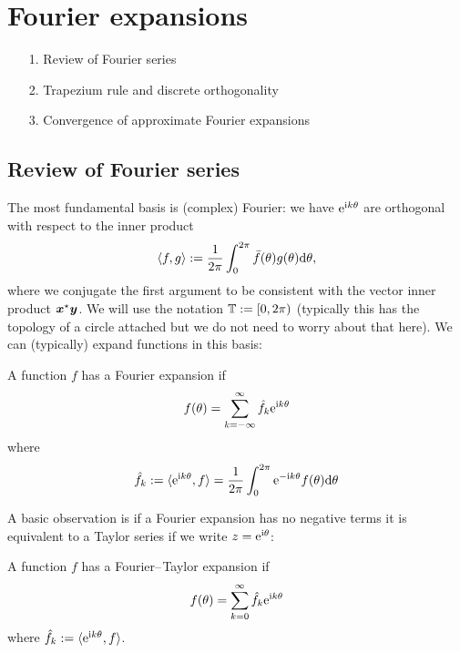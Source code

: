 
\section{Fourier expansions}
\begin{itemize}
\item[1. ] Review of Fourier series


\item[2. ] Trapezium rule and discrete orthogonality


\item[3. ] Convergence of approximate Fourier expansions

\end{itemize}
\subsection{Review of Fourier series}
The most fundamental basis is (complex) Fourier: we have ${\rm e}^{{\rm i} k \ensuremath{\theta}}$ are orthogonal with respect to the inner product
\[
\ensuremath{\langle}f, g \ensuremath{\rangle} := {1 \over 2\ensuremath{\pi}} \ensuremath{\int}_0^{2\ensuremath{\pi}} \bar f(\ensuremath{\theta}) g(\ensuremath{\theta}) {\rm d}\ensuremath{\theta},
\]
where we conjugate the first argument to be consistent with the vector inner product $\bm{{\mbox{\boldmath$x$\unboldmath}}}^\star \bm{{\mbox{\boldmath$y$\unboldmath}}}$. We will use the notation ${\mathbb T} := [0,2\pi)$ (typically this has the topology of a circle attached but we do not need to worry about that here). We can (typically) expand functions in this basis:

\begin{definition}[Fourier] A function $f$ has a Fourier expansion if
\[
f(\ensuremath{\theta}) = \ensuremath{\sum}_{k = -\ensuremath{\infty}}^\ensuremath{\infty} \hat f_k {\rm e}^{{\rm i} k \ensuremath{\theta}}
\]
where
\[
\hat f_k := \ensuremath{\langle}{\rm e}^{{\rm i} k \ensuremath{\theta}}, f\ensuremath{\rangle} = {1 \over 2\ensuremath{\pi}} \ensuremath{\int}_0^{2\ensuremath{\pi}}  {\rm e}^{-{\rm i} k \ensuremath{\theta}} f(\ensuremath{\theta}) {\rm d}\ensuremath{\theta}
\]
\end{definition}

A basic observation is if a Fourier expansion has no negative terms it is equivalent to a Taylor series if we write $z = {\rm e}^{{\rm i} \ensuremath{\theta}}$:

\begin{definition} A function $f$ has a Fourier\ensuremath{\endash}Taylor expansion if
\[
f(\ensuremath{\theta}) = \ensuremath{\sum}_{k = 0}^\ensuremath{\infty} \hat f_k {\rm e}^{{\rm i} k \ensuremath{\theta}}
\]
where $\hat f_k := \ensuremath{\langle}{\rm e}^{{\rm i} k \ensuremath{\theta}}, f\ensuremath{\rangle}$. \end{definition}

